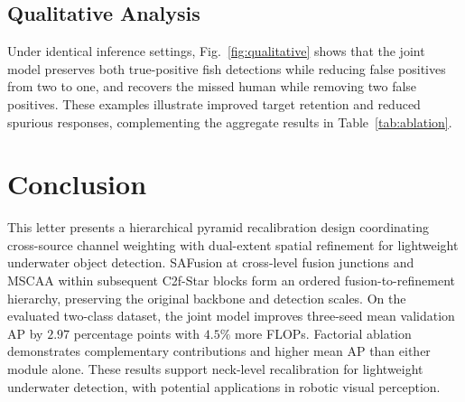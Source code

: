 \documentclass[letterpaper,10pt,conference]{ieeeconf}
\begin{document}
\subsection{Qualitative Analysis}
Under identical inference settings, Fig.~\ref{fig:qualitative} shows that the
joint model preserves both true-positive fish detections while reducing false
positives from two to one, and recovers the missed human while removing two
false positives. These examples illustrate improved target retention and
reduced spurious responses, complementing the aggregate results in
Table~\ref{tab:ablation}.

\section{Conclusion}
This letter presents a hierarchical pyramid recalibration design
coordinating cross-source channel weighting with dual-extent spatial
refinement for lightweight underwater object detection. SAFusion at
cross-level fusion junctions and MSCAA within subsequent C2f-Star blocks
form an ordered fusion-to-refinement hierarchy, preserving the original
backbone and detection scales. On the evaluated two-class dataset,
the joint model improves three-seed mean validation AP by \(2.97\)
percentage points with \(4.5\%\) more FLOPs. Factorial ablation demonstrates
complementary contributions and higher mean AP than either module alone.
These results support neck-level recalibration for lightweight underwater
detection, with potential applications in robotic visual perception.




\end{document}
